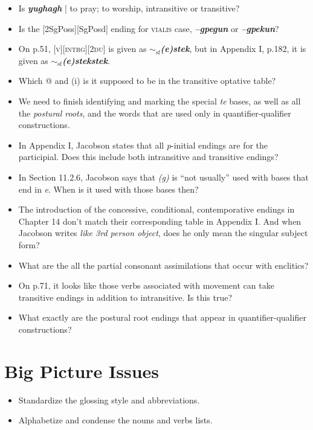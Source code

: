 \documentclass{article}
\begin{document}
\begin{itemize}
\renewcommand\labelitemi{$\cdot$}

\item Is \textit{\textbf{yughagh}} | to pray; to worship, intransitive or transitive?

\item Is the [2SgPoss][SgPosd] ending for \textsc{vialis} case, \textit{\textbf{--gpegun}} or \textit{\textbf{--gpekun}}?

\item On p.51, \textsc{[v][intrg][2du]} is given as \textit{\textbf{$\sim_\text{sf}$(e)stek}}, but in Appendix I, p.182, it is given as \textit{\textbf{$\sim_\text{sf}$(e)stekstek}}.

\item Which @ and (i) is it supposed to be in the transitive optative table?

\item We need to finish identifying and marking the special \textit{te} bases, as well as all the \textit{postural roots}, and the words that are used only in quantifier-qualifier constructions.

\item In Appendix I, Jacobson states that all \textit{p}-initial endings are for the participial.
%
Does this include both intransitive and transitive endings?

\item In Section 11.2.6, Jacobson says that \textit{(g)} is ``not usually'' used with bases that end in \textit{e}.
%
When is it used with those bases then?

\item The introduction of the concessive, conditional, contemporative endings in Chapter 14 don't match their corresponding table in Appendix I.
%
And when Jacobson writes \textit{like 3rd person object}, does he only mean the singular subject form?

\item What are the all the partial consonant assimilations that occur with enclitics?

\item On p.71, it looks like those verbs associated with movement can take transitive endings in addition to intransitive.
%
Is this true?

\item What exactly are the postural root endings that appear in quantifier-qualifier constructions?

\end{itemize}


\section{Big Picture Issues}

\begin{itemize}
\renewcommand\labelitemi{$\cdot$}

\item Standardize the glossing style and abbreviations.

\item Alphabetize and condense the nouns and verbs lists.

\end{itemize}
\end{document}
